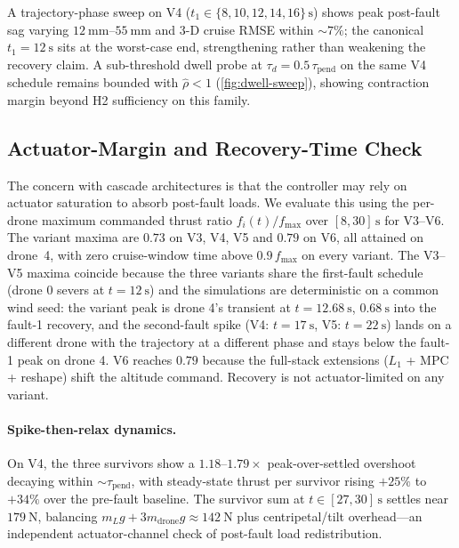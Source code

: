 \documentclass[lettersize,journal]{IEEEtran}
\begin{document}
A trajectory-phase sweep on V4 ($t_1\in\{8,10,12,14,16\}\,\si{\second}$) shows peak post-fault sag varying $\SI{12}{\milli\metre}$--$\SI{55}{\milli\metre}$ and 3-D cruise RMSE within $\sim 7\%$; the canonical $t_1=\SI{12}{\second}$ sits at the worst-case end, strengthening rather than weakening the recovery claim. A sub-threshold dwell probe at $\tau_d=0.5\,\tau_{\mathrm{pend}}$ on the same V4 schedule remains bounded with $\hat\rho<1$ (\cref{fig:dwell-sweep}), showing contraction margin beyond H2 sufficiency on this family.

\subsection{Actuator-Margin and Recovery-Time Check}
\label{sec:VI-actuator-recovery}

The concern with cascade architectures is that the controller may rely on actuator saturation to absorb post-fault loads. We evaluate this using the per-drone maximum commanded thrust ratio $f_i(t)/f_{\max}$ over $[8,30]\,\si{\second}$ for V3--V6. The variant maxima are $0.73$ on V3, V4, V5 and $0.79$ on V6, all attained on drone~4, with zero cruise-window time above $0.9\,f_{\max}$ on every variant. The V3--V5 maxima coincide because the three variants share the first-fault schedule (drone 0 severs at $t=\SI{12}{\second}$) and the simulations are deterministic on a common wind seed: the variant peak is drone 4's transient at $t=\SI{12.68}{\second}$, $\SI{0.68}{\second}$ into the fault-1 recovery, and the second-fault spike (V4: $t=\SI{17}{\second}$, V5: $t=\SI{22}{\second}$) lands on a different drone with the trajectory at a different phase and stays below the fault-1 peak on drone 4. V6 reaches $0.79$ because the full-stack extensions ($L_1$ + MPC + reshape) shift the altitude command. Recovery is not actuator-limited on any variant.

\paragraph{Spike-then-relax dynamics.} On V4, the three survivors show a $1.18$--$1.79\times$ peak-over-settled overshoot decaying within $\sim\tau_{\mathrm{pend}}$, with steady-state thrust per survivor rising $+25\%$ to $+34\%$ over the pre-fault baseline. The survivor sum at $t\in[27,30]\,\si{\second}$ settles near $\SI{179}{\newton}$, balancing $m_L g+3m_{\mathrm{drone}}g\approx\SI{142}{\newton}$ plus centripetal/tilt overhead---an independent actuator-channel check of post-fault load redistribution.
\end{document}

